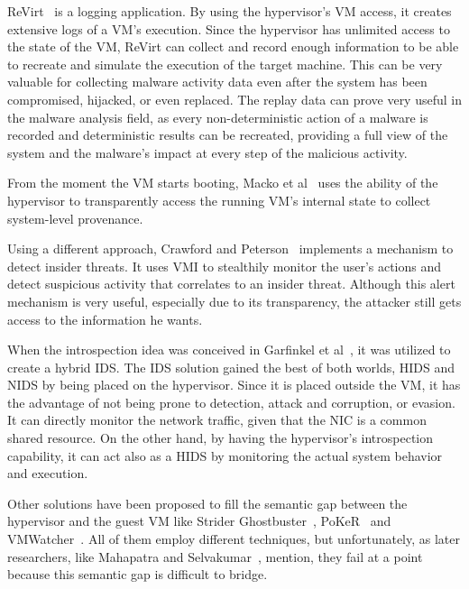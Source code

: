 \par ReVirt~\cite{dunlap2002revirt} is a logging application. By using the hypervisor’s \ac{VM} access, it creates extensive logs of a \ac{VM}’s execution. Since the hypervisor has unlimited access to the state of the \ac{VM}, ReVirt can collect and record enough information to be able to recreate and simulate the execution of the target machine. This can be very valuable for collecting malware activity data even after the system has been compromised, hijacked, or even replaced. The replay data can prove very useful in the malware analysis field, as every non-deterministic action of a malware is recorded and deterministic results can be recreated, providing a full view of the system and the malware's impact at every step of the malicious activity.

\par From the moment the \ac{VM} starts booting, Macko et al~\cite{macko2011collecting} uses the ability of the hypervisor to transparently access the running \ac{VM}’s internal state to collect system-level provenance. 

\par Using a different approach, Crawford and Peterson~\cite{crawford2013insider} implements a mechanism to detect insider threats. It uses \ac{VMI} to stealthily monitor the user’s actions and detect suspicious activity that correlates to an insider threat. Although this alert mechanism is very useful, especially due to its transparency, the attacker still gets access to the information he wants.

\par When the introspection idea was conceived in Garfinkel et al~\cite{garfinkel2003virtual}, it was utilized to create a hybrid \ac{IDS}. The \ac{IDS} solution gained the best of both worlds, \ac{HIDS} and \ac{NIDS} by being placed on the hypervisor. Since it is placed outside the \ac{VM}, it has the advantage of not being prone to detection, attack and corruption, or evasion. It can directly monitor the network traffic, given that the \ac{NIC} is a common shared resource. On the other hand, by having the hypervisor’s introspection capability, it can act also as a \ac{HIDS} by monitoring the actual system behavior and execution. 

\par Other solutions have been proposed to fill the semantic gap between the hypervisor and the guest \ac{VM} like Strider Ghostbuster~\cite{wang2005detecting}, PoKeR~\cite{riley2009multi} and VMWatcher~\cite{jiang2007stealthy}. All of them employ different techniques, but unfortunately, as later researchers, like Mahapatra and Selvakumar~\cite{mahapatra2011online}, mention, they fail at a point because this semantic gap is difficult to bridge. 


